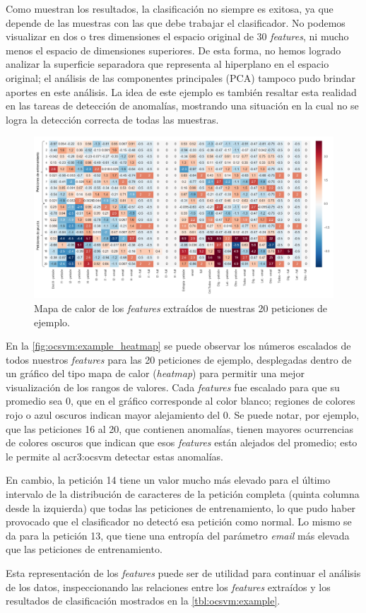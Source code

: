 Como muestran los resultados, la clasificación no siempre es exitosa,
ya que depende de las muestras con las que debe trabajar el clasificador.
No podemos visualizar en dos o tres dimensiones el espacio original de
30 \textit{features}, ni mucho menos el espacio de dimensiones superiores.
De esta forma, no hemos logrado analizar la superficie separadora que
representa al hiperplano en el espacio original; el análisis de las
componentes principales (PCA) tampoco pudo brindar aportes en este análisis.
La idea de este ejemplo es también resaltar esta realidad en las tareas
de detección de anomalías, mostrando una situación en la cual no se logra
la detección correcta de todas las muestras.

\begin{figure}[ht]
    \centering
    \includegraphics[width=\linewidth]{images/example-features-heatmap.png}

    \caption{Mapa de calor de los \textit{features} extraídos de nuestras
        20 peticiones de ejemplo.}
    \label{fig:ocsvm:example_heatmap}
\end{figure}

En la \autoref{fig:ocsvm:example_heatmap} se puede observar los números
escalados de todos nuestros \textit{features} para las 20 peticiones de
ejemplo, desplegadas dentro de un gráfico del tipo mapa de calor
(\textit{heatmap}) para permitir una mejor visualización de los rangos
de valores. Cada \textit{features} fue escalado para que su promedio sea 0,
que en el gráfico corresponde al color blanco; regiones de colores rojo o
azul oscuros indican mayor alejamiento del 0.
Se puede notar, por ejemplo, que las peticiones 16 al 20, que contienen
anomalías, tienen mayores ocurrencias de colores oscuros que indican que
esos \textit{features} están alejados del promedio; esto le permite al
\gls{acr3:ocsvm} detectar estas anomalías.

En cambio, la petición 14 tiene un valor mucho más elevado para el último
intervalo de la distribución de caracteres de la petición completa
(quinta columna desde la izquierda) que todas las peticiones de entrenamiento,
lo que pudo haber provocado que el clasificador no detectó esa petición
como normal. Lo mismo se da para la petición 13, que tiene una entropía
del parámetro \textit{email} más elevada que las peticiones de entrenamiento.

Esta representación de los \textit{features} puede ser de utilidad para
continuar el análisis de los datos, inspeccionando las relaciones entre
los \textit{features} extraídos y los resultados de clasificación
mostrados en la \autoref{tbl:ocsvm:example}.
